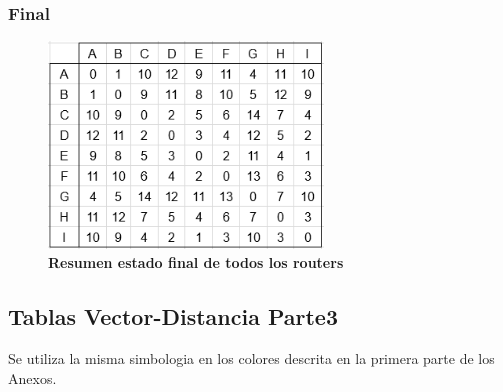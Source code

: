 \documentclass[12pt]{article}
\begin{document}
\subsubsection{Final}

\begin{figure}[H] 
\centering 
\includegraphics[width=0.65\textwidth]{imagenes/2final.png} \caption{\small \textbf{Resumen estado final de todos los routers}}
\label{fig:diagrama_53} 
\end{figure}

\newpage

\subsection{Tablas Vector-Distancia Parte3}
Se utiliza la misma simbologia en los colores descrita en la primera parte de los Anexos.
\end{document}
